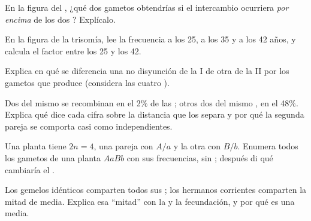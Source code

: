 \begin{exercise}[$\star\star$]\label{exo:g12:meiosis-genetic-shuffling:9}
En la figura del , ¿qué dos gametos obtendrías si el
intercambio ocurriera \emph{por encima} de los dos ? Explícalo.
\end{exercise}

\begin{exercise}[$\star\star$]\label{exo:g12:meiosis-genetic-shuffling:10}
En la figura de la trisomía, lee la frecuencia a los 25, a los 35 y a
los 42 años, y calcula el factor entre los 25 y los 42.
\end{exercise}

\begin{exercise}[$\star\star$]\label{exo:g12:meiosis-genetic-shuffling:11}
Explica en qué se diferencia una no disyunción de la  I de otra
de la  II por los gametos que produce (considera las cuatro
).
\end{exercise}

\begin{exercise}[$\star\star\star$]\label{exo:g12:meiosis-genetic-shuffling:12}
Dos  del mismo  se recombinan en el 2\% de las ;
otros dos del mismo , en el 48\%. Explica qué dice cada cifra
sobre la distancia que los separa y por qué la segunda pareja se
comporta casi como  independientes.
\end{exercise}

\begin{exercise}[$\star\star\star$]\label{exo:g12:meiosis-genetic-shuffling:13}
Una planta tiene $2n = 4$, una pareja con $A/a$ y la otra con $B/b$.
Enumera todos los gametos de una planta $AaBb$ con sus frecuencias, sin
; después di qué cambiaría el .
\end{exercise}

\begin{exercise}[$\star\star\star$]\label{exo:g12:meiosis-genetic-shuffling:14}
Los gemelos idénticos comparten todos sus ; los hermanos
corrientes comparten la mitad de media. Explica esa ``mitad'' con la
 y la fecundación, y por qué es una media.
\end{exercise}

